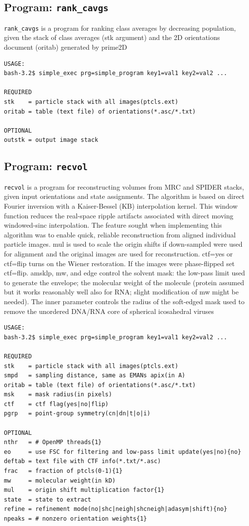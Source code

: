 \documentclass[a4paper,11pt]{article}
\newcommand{\prgname}[1]{\textcolor{NavyBlue}{\texttt{#1}}}
\begin{document}
\subsection{Program: \prgname{rank\_cavgs}}
\label{rank_cavgs}
\prgname{rank\_cavgs} is a program for ranking class averages by decreasing population, given the stack of class averages (stk argument) and the 2D orientations document (oritab) generated by prime2D

\begin{verbatim}
USAGE:
bash-3.2$ simple_exec prg=simple_program key1=val1 key2=val2 ...

REQUIRED
stk    = particle stack with all images(ptcls.ext)
oritab = table (text file) of orientations(*.asc/*.txt)

OPTIONAL
outstk = output image stack
\end{verbatim}

\subsection{Program: \prgname{recvol}}
\label{recvol}
\prgname{recvol} is a program for reconstructing volumes from MRC and SPIDER stacks, given input orientations and state assignments. The algorithm is based on direct Fourier inversion with a Kaiser-Bessel (KB) interpolation kernel. This window function reduces the real-space ripple artifacts associated with direct moving windowed-sinc interpolation. The feature sought when implementing this algorithm was to enable quick, reliable reconstruction from aligned individual particle images. mul is used to scale the origin shifts if down-sampled were used for alignment and the original images are used for reconstruction. ctf=yes or ctf=flip turns on the Wiener restoration. If the images were phase-flipped set ctf=flip. amsklp, mw, and edge control the solvent mask: the low-pass limit used to generate the envelope; the molecular weight of the molecule (protein assumed but it works reasonably well also for RNA; slight modification of mw might be needed). The inner parameter controls the radius of the soft-edged mask used to remove the unordered DNA/RNA core of spherical icosahedral viruses

\begin{verbatim}
USAGE:
bash-3.2$ simple_exec prg=simple_program key1=val1 key2=val2 ...

REQUIRED
stk    = particle stack with all images(ptcls.ext)
smpd   = sampling distance, same as EMANs apix(in A)
oritab = table (text file) of orientations(*.asc/*.txt)
msk    = mask radius(in pixels)
ctf    = ctf flag(yes|no|flip)
pgrp   = point-group symmetry(cn|dn|t|o|i)

OPTIONAL
nthr   = # OpenMP threads{1}
eo     = use FSC for filtering and low-pass limit update(yes|no){no}
deftab = text file with CTF info(*.txt/*.asc)
frac   = fraction of ptcls(0-1){1}
mw     = molecular weight(in kD)
mul    = origin shift multiplication factor{1}
state  = state to extract
refine = refinement mode(no|shc|neigh|shcneigh|adasym|shift){no}
npeaks = # nonzero orientation weights{1}
\end{verbatim}
\end{document}
